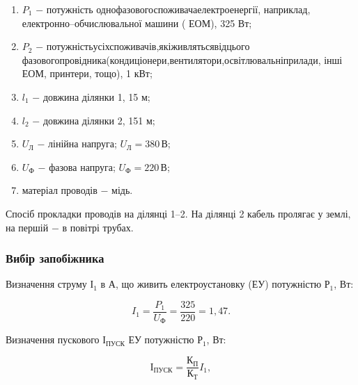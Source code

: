 \begin{enumerate}
	\item $P_{1}$ $-$ потужність \hfill однофазового\hfill споживача\hfill електроенергії,\newline \hspace*{-18mm} наприклад, електронно–обчислювальної машини ( ЕОМ), 325 Вт;
	\item $P_{2}$ $-$ потужність\hfill усіх\hfill споживачів,\hfill які\hfill живляться\hfill від\hfill цього\newline \hspace*{-18mm} фазового\hfill провідника\hfill (кондиціонери,\hfill вентилятори,\hfill освітлювальні\hfill прилади,\newline \hspace*{-18mm} інші ЕОМ, принтери, тощо), 1 кВт;
	\item $l_{1}$ $-$ довжина ділянки 1, 15 м;
	\item $l_{2}$ $-$ довжина ділянки 2, 151 м;
	\item $U_{\text{Л}}$ $-$ лінійна напруга; $U_{\text{Л}} = 380 \, \text{В}$; 
	\item $U_{\text{Ф}}$ $-$ фазова напруга; $U_{\text{Ф}} = 220 \, \text{В}$; 
	\item матеріал проводів $-$ мідь.
\end{enumerate}

Спосіб прокладки проводів на ділянці 1–2. На ділянці 2 кабель пролягає у землі, на першій $-$ в повітрі трубах.

\subsubsection{Вибір запобіжника}

Визначення струму $І_{1}$ в А, що живить електроустановку (ЕУ) потужністю $Р_{1}$, Вт:

\begin{equation}\label{eq:work2}
	I_{1} = \frac{P_{1}}{U_{\text{Ф}}}=\frac{325}{220}=1,47.
\end{equation}

\vspace{1.5em}

Визначення пускового $І_{\text{ПУСК}}$ ЕУ потужністю $Р_{\text{1}}$, Вт:

\begin{equation}\label{eq:work3}
	І_{\text{ПУСК}} = \frac{\text{К}_{\text{П}}}{\text{К}_{\text{Т}}} I_{1},
\end{equation}

